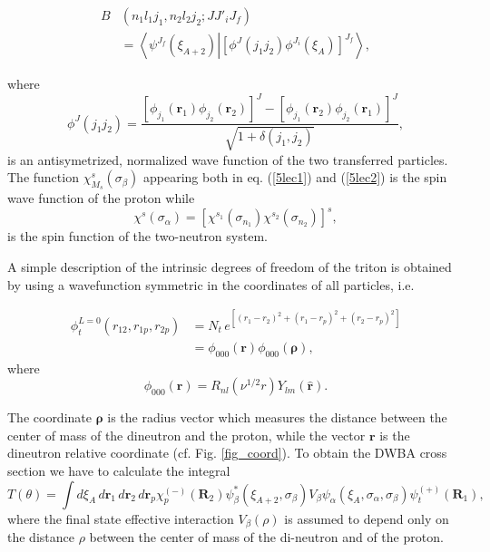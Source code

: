 \begin{equation}\label{5lec3}
\begin{split}
B&(n_1 l_1 j_1,n_2 l_2 j_2;JJ'_iJ_f)\\
&=\left\langle  \psi^{J_f}(\xi_{A+2})\left |\left[ \phi^J(j_1 j_2) \phi^{J_i}(\xi_A)\right]^{J_f}\right. \right\rangle,
\end{split}
\end{equation}

where
\begin{equation}\label{5lec4}
\phi^J(j_1 j_2)=\frac{\left[ \phi_{j_1}(\mathbf r_1) \phi_{j_2}(\mathbf r_2)\right]^{J}-
\left[ \phi_{j_1}(\mathbf r_2) \phi_{j_2}(\mathbf r_1)\right]^{J}}{\sqrt{1+\delta(j_1,j_2)}},
\end{equation}
is an antisymetrized, normalized wave function of the two transferred particles. The function $\chi^{s}_{M_{s}}(\sigma_\beta)$ appearing  both in eq. (\ref{5lec1}) and (\ref{5lec2}) is the spin wave function of the proton while 
\begin{equation}\label{5lec5}
\chi^{s}(\sigma_\alpha)=\left[ \chi^{s_1}(\sigma_{n_1}) \chi^{s_2}(\sigma_{n_2})\right]^{s},
\end{equation}
is the spin function of the two-neutron system.


A simple description of the intrinsic  degrees of freedom of the triton is obtained by using a wavefunction symmetric in the coordinates of all particles, i.e.

\begin{equation}\label{5lec6}
\begin{split}
\phi_t^{L=0}\left(r_{12},r_{1p},r_{2p}\right)&=N_t\,e^{[(r_1-r_2)^2+(r_1-r_p)^2+(r_2-r_p)^2]}\\
&=\phi_{000}(\mathbf r)\phi_{000}(\pmb \rho),
\end{split}
\end{equation}
where
\begin{equation}
\phi_{000}(\mathbf r)=R_{nl}(\nu^{1/2 }r) Y_{lm}(\mathbf{\hat r}).
\end{equation}

The coordinate $\pmb \rho$ is the radius vector which measures the distance between the center of mass of the dineutron and the proton, while the vector $\mathbf r$ is the dineutron relative coordinate (cf. Fig. \ref{fig_coord}).
To obtain the DWBA cross section we have to calculate the integral
\begin{equation}\label{5lec8}
T(\theta)=\int d\xi_A \,d\mathbf r_1 \,d\mathbf r_2 \,d\mathbf r_p \chi^{(-)}_p(\mathbf R_2) \psi^*_\beta(\xi_{A+2},\sigma_\beta) V_\beta \psi_\alpha(\xi_{A},\sigma_\alpha,\sigma_\beta)\psi_t^{(+)}(\mathbf R_1),
\end{equation}
where the final state effective interaction $V_\beta(\rho)$ is assumed to depend only on the distance $\rho$ between the center of mass of the di-neutron and of the proton. 


